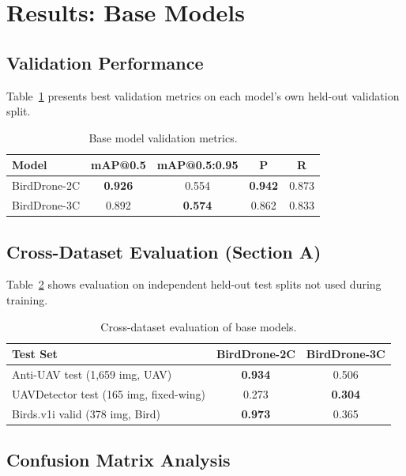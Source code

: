 \documentclass[11pt]{article}
\begin{document}
\section{Results: Base Models}

\subsection{Validation Performance}

Table~\ref{tab:val_base} presents best validation metrics on each model's
own held-out validation split.

\begin{table}[H]
\centering
\caption{Base model validation metrics.}
\label{tab:val_base}
\begin{tabular}{lcccc}
\toprule
\textbf{Model} & \textbf{mAP@0.5} & \textbf{mAP@0.5:0.95} & \textbf{P} & \textbf{R} \\
\midrule
BirdDrone-2C & \textbf{0.926} & 0.554 & \textbf{0.942} & 0.873 \\
BirdDrone-3C & 0.892 & \textbf{0.574} & 0.862 & 0.833 \\
\bottomrule
\end{tabular}
\end{table}

\subsection{Cross-Dataset Evaluation (Section A)}

Table~\ref{tab:cross_base} shows evaluation on independent held-out test
splits not used during training.

\begin{table}[H]
\centering
\caption{Cross-dataset evaluation of base models.}
\label{tab:cross_base}
\begin{tabular}{lcc}
\toprule
\textbf{Test Set} & \textbf{BirdDrone-2C} & \textbf{BirdDrone-3C} \\
\midrule
Anti-UAV test (1,659 img, UAV)     & \textbf{0.934} & 0.506 \\
UAVDetector test (165 img, fixed-wing) & 0.273 & \textbf{0.304} \\
Birds.v1i valid (378 img, Bird)    & \textbf{0.973} & 0.365 \\
\bottomrule
\end{tabular}
\end{table}

\subsection{Confusion Matrix Analysis}
\end{document}
